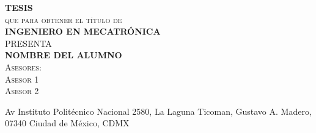 \begin{center}
	\textbf{\textsc{\LARGE T\qquad E\qquad S\qquad I\qquad S}}\\
	\vspace{10mm}
	\textsc{\LARGE que para obtener el t\'itulo de}\\
	\vspace{10mm}
	\textbf{\textsc{\LARGE INGENIERO EN MECATR\'ONICA}}\\
	\vspace{10mm}
	\textsc{\LARGE PRESENTA}\\
	\vspace{10mm}
	\textbf{\textsc{\LARGE NOMBRE DEL ALUMNO}}\\
	\vspace{15mm}
	\textsc{\Large Asesores:}\\
	\vspace{5mm}
	\textsc{\Large Asesor 1}\\
	\textsc{\Large Asesor 2}
	
	\begin{center}
		Av Instituto Politécnico Nacional 2580, La Laguna Ticoman, Gustavo A. Madero, 07340 Ciudad de México, CDMX
	\end{center}

\end{center}
